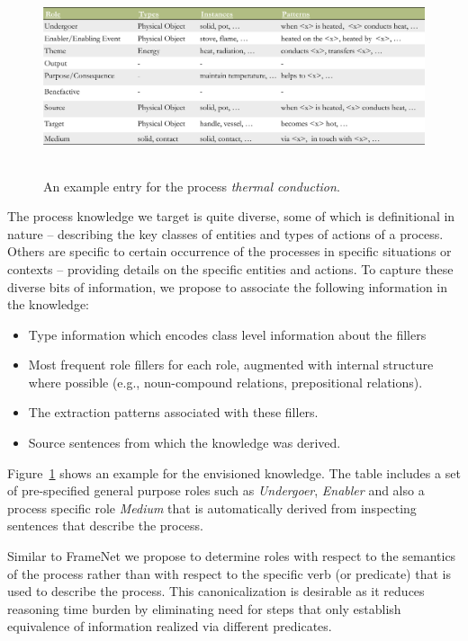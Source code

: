 \begin{figure}[hb]
	\begin{center}
	\includegraphics[width=6.26in,height=2.26in]{figures/processkb-snippet.pdf} 	
	\caption{\label{fig:kbsnippet} 
	{An example entry for the process {\em thermal conduction}.}
	}
	\end{center}
\end{figure}
The process knowledge we target is quite diverse, some of which is definitional in nature -- describing the key classes of entities and types of actions of a process. Others are specific to certain occurrence of the processes in specific situations or contexts -- providing details on the specific entities and actions. To capture these diverse bits of information, we propose to associate the following information in the knowledge:
\begin{itemize}
\item Type information which encodes class level information about the fillers
\item Most frequent role fillers for each role, augmented with internal structure where possible (e.g., noun-compound relations, prepositional relations).
\item The extraction patterns associated with these fillers.
\item Source sentences from which the knowledge was derived.
\end{itemize}
Figure~\ref{fig:kbsnippet} shows an example for the envisioned knowledge. 
The table includes a set of pre-specified general purpose roles such as {\em Undergoer}, {\em Enabler} and also a process specific role {\em Medium} that is automatically derived from inspecting sentences that describe the process. 

Similar to FrameNet we propose to determine roles with respect to the semantics of the process rather than with respect to the specific verb (or predicate) that is used to describe the process.
This canonicalization is desirable as it reduces reasoning time burden by eliminating need for steps that only establish equivalence of information realized via different predicates.
%
